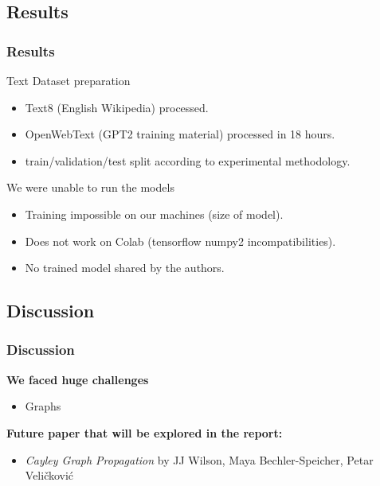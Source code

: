 \documentclass[10pt, aspectratio = 169]{beamer}
\begin{document}
\subsection{Results}
\begin{frame}
    \frametitle{Results}
    \begin{exampleblock}{Text Dataset preparation}
        \begin{itemize}
            \item Text8 (English Wikipedia) processed.
            \item OpenWebText (GPT2 training material) processed in 18 hours.
            \item train/validation/test split according to experimental methodology.
        \end{itemize}
    \end{exampleblock}

    \begin{alertblock}{We were unable to run the models}
        \begin{itemize}
            \item Training impossible on our machines (size of model).
            \item Does not work on Colab (tensorflow numpy2 incompatibilities).
            \item No trained model shared by the authors.
        \end{itemize}
    \end{alertblock}
    
\end{frame}

\subsection{Discussion}
\begin{frame}
    \frametitle{Discussion}
    \textbf{We faced huge challenges}
    \begin{itemize}
        \item Graphs
    \end{itemize} 
    
    \textbf{Future paper that will be explored in the report:}
    \begin{itemize}
        \item \textit{Cayley Graph Propagation} by JJ Wilson, Maya 
        Bechler-Speicher, Petar Veličković \cite{wilson2024cayleygraphpropagation}
    \end{itemize}
\end{frame}
\end{document}
